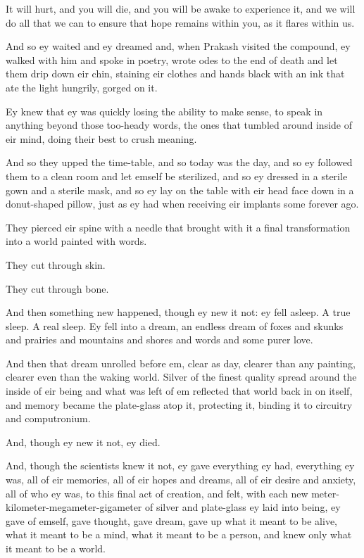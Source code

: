 It will hurt, and you will die, and you will be awake to experience it, and we will do all that we can to ensure that hope remains within you, as it flares within us.

And so ey waited and ey dreamed and, when Prakash visited the compound, ey walked with him and spoke in poetry, wrote odes to the end of death and let them drip down eir chin, staining eir clothes and hands black with an ink that ate the light hungrily, gorged on it.

Ey knew that ey was quickly losing the ability to make sense, to speak in anything beyond those too-heady words, the ones that tumbled around inside of eir mind, doing their best to crush meaning.

And so they upped the time-table, and so today was the day, and so ey followed them to a clean room and let emself be sterilized, and so ey dressed in a sterile gown and a sterile mask, and so ey lay on the table with eir head face down in a donut-shaped pillow, just as ey had when receiving eir implants some forever ago.

They pierced eir spine with a needle that brought with it a final transformation into a world painted with words.

They cut through skin.

They cut through bone.

And then something new happened, though ey new it not: ey fell asleep. A true sleep. A real sleep. Ey fell into a dream, an endless dream of foxes and skunks and prairies and mountains and shores and words and some purer love.

And then that dream unrolled before em, clear as day, clearer than any painting, clearer even than the waking world. Silver of the finest quality spread around the inside of eir being and what was left of em reflected that world back in on itself, and memory became the plate-glass atop it, protecting it, binding it to circuitry and computronium.

And, though ey new it not, ey died.

And, though the scientists knew it not, ey gave everything ey had, everything ey was, all of eir memories, all of eir hopes and dreams, all of eir desire and anxiety, all of who ey was, to this final act of creation, and felt, with each new meter-kilometer-megameter-gigameter of silver and plate-glass ey laid into being, ey gave of emself, gave thought, gave dream, gave up what it meant to be alive, what it meant to be a mind, what it meant to be a person, and knew only what it meant to be a world.

